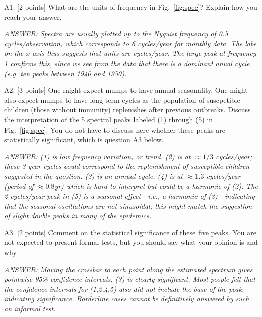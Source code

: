 \documentclass[11pt]{article}
\def\ans{\it ANSWER: }
\begin{document}
A1. [2 points] What are the units of frequency in Fig.~\ref{fig:spec}? Explain how you reach your answer.

{\ans Spectra are usually plotted up to the Nyquist frequency of 0.5 cycles/observation, which corresponds to 6 cycles/year for monthly data. The labe on the $x$-axis thus suggests that units are cycles/year. The large peak at frequency 1 confirms this, since we see from the data that there is a dominant anual cycle (e.g. ten peaks between 1940 and 1950).}




A2. [3 points] One might expect mumps to have annual seasonality. 
One might also expect mumps to have long term cycles as the
population of suscpetible children (those without immunity)
replenishes after previous outbreaks. 
Discuss the interpretation of the 5 spectral peaks labeled (1) through (5) in Fig.~\ref{fig:spec}. You do not have to discuss here whether these peaks are statistically significant, which is question A3 below.

{\ans (1) is low frequency variation, or trend. (2) is at $\approx 1/3$ cycles/year; these 3 year cycles could correspond to the replenishment of susceptible children suggested in the question. (3) is an annual cycle. (4) is at $\approx 1.3$ cycles/year (period of $\approx 0.8$yr) which is hard to interpret but could be a harmonic of (2). The  2 cycles/year peak in (5) is a seasonal effect---i.e., a harmonic of (3)---indicating that the seasonal oscillations are not sinusoidal; this might match the suggestion of slight double peaks in many of the epidemics.}


A3. [2 points] Comment on the statistical significance of these five peaks. You are not expected to present formal tests, but you should say what your opinion is and why.

{\ans Moving the crossbar to each point along the estimated spectrum gives pointwise 95\% confidence intervals. (3) is clearly significant. Most people felt that the confidence intervals for (1,2,4,5) also did not include the base of the peak, indicating significance. Borderline cases cannot be definitively answered by such an informal test.}

\end{document}
